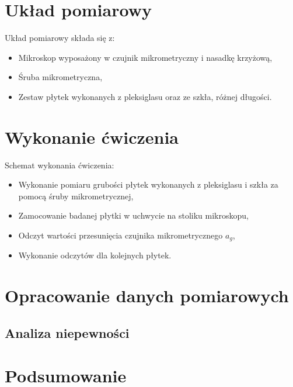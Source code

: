 \documentclass[a4paper,12pts]{article}
\begin{document}
	
	\section{Układ pomiarowy}
	
	Układ pomiarowy składa się z:
	
	\begin{itemize}
		\item Mikroskop wyposażony w czujnik mikrometryczny i nasadkę krzyżową,
		\item Śruba mikrometryczna,
		\item Zestaw płytek wykonanych z pleksiglasu oraz ze szkła, różnej długości.
	\end{itemize}
	
	
	\section{Wykonanie ćwiczenia}
	
	Schemat wykonania ćwiczenia:
	
	\begin{itemize}
		\item Wykonanie pomiaru grubości płytek wykonanych z pleksiglasu i szkła za pomocą śruby mikrometrycznej,
		\item Zamocowanie badanej płytki w uchwycie na stoliku mikroskopu,
		\item Odczyt wartości przesunięcia czujnika mikrometrycznego $a_g$,
		\item Wykonanie odczytów dla kolejnych płytek.
	\end{itemize}
	
	
	\section{Opracowanie danych pomiarowych}
	
	
	\subsection{Analiza niepewności}
	

	\section{Podsumowanie}

\end{document}

